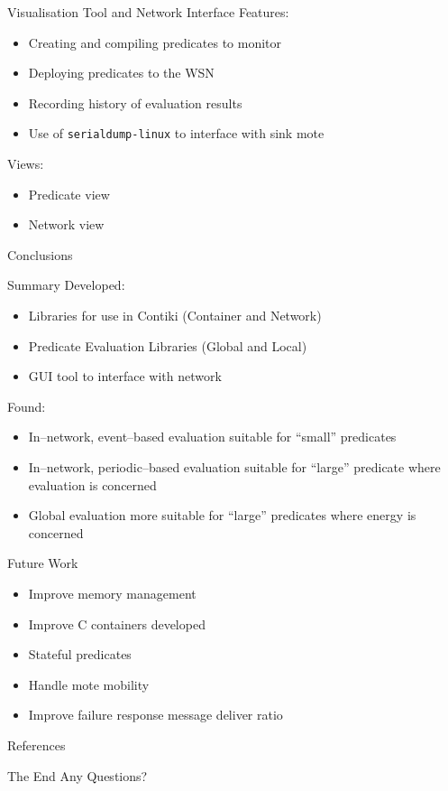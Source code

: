 \documentclass[usenames,dvipsnames]{beamer}
\newcommand{\subtitleframe}[1]{\begin{frame}\begin{block}{\centering\Large \vspace{1em} #1 \vspace{1em}}\end{block}\end{frame}}
\begin{document}
\begin{frame}{Visualisation Tool and Network Interface}
Features:
\begin{itemize}
	\item Creating and compiling predicates to monitor
	\item Deploying predicates to the WSN
	\item Recording history of evaluation results
	\item Use of \texttt{serialdump-linux} to interface with sink mote
\end{itemize}
\vspace{1em}

Views:
\begin{itemize}
	\item Predicate view
	\item Network view
\end{itemize}
\end{frame}


\subtitleframe{Conclusions}

\begin{frame}{Summary}
Developed:
	\begin{itemize}
		\item Libraries for use in Contiki (Container and Network)
		\item Predicate Evaluation Libraries (Global and Local)
		\item GUI tool to interface with network
	\end{itemize}
\vspace{1em}

Found:
	\begin{itemize}
		\item In--network, event--based evaluation suitable for ``small'' predicates
		\item In--network, periodic--based evaluation suitable for ``large'' predicate where evaluation is concerned
		\item Global evaluation more suitable for ``large'' predicates where energy is concerned
	\end{itemize}
\end{frame}

\begin{frame}{Future Work}
	\begin{itemize}
		\item Improve memory management
		\item Improve C containers developed
		\item Stateful predicates
		\item Handle mote mobility
		\item Improve failure response message deliver ratio
	\end{itemize}
\end{frame}

\begin{frame}[allowframebreaks]{References}
	
	
\end{frame}

\begin{frame}{The End}
Any Questions?
\end{frame}
\end{document}
